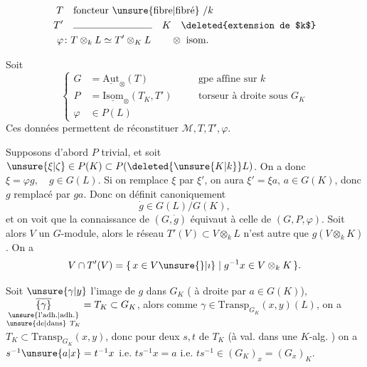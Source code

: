 \[
\begin{aligned}
T&\quad\text{foncteur \unsure{fibre|fibré} }/k\\
T'&\quad\rule{2.8cm}{.35pt}\quad K\quad\text{\deleted{extension de $k$}}\\
\varphi&\colon T\otimes_k L\simeq T'\otimes_K L\qquad\otimes\ \text{isom.}
\end{aligned}
\]

Soit
\[
\left\{\begin{aligned}
G&=\underline{\mathrm{Aut}}_{\otimes}(T)&\quad&\text{gpe affine sur }k\\
P&=\underline{\mathrm{Isom}}_{\otimes}(T_K,T')&&\text{torseur à droite sous }G_K\\
\varphi&\in P(L)
\end{aligned}\right.
\]
Ces données permettent de réconstituer $\mathcal M,T,T',\varphi$.

Supposons d'abord $P$ trivial, et soit $\unsure{\xi|\zeta}\in P(K)\subset P(\deleted{\unsure{K|k}}L)$. On a donc $\xi=\varphi g,\quad g\in G(L)$. Si on remplace $\xi$ par $\xi'$, on aura $\xi'=\xi a$, $a\in G(K)$, donc $g$ remplacé par $ga$. Donc on définit canoniquement
\[
\dot g\in G(L)/G(K),
\]
et on voit que la connaissance de $(G,\dot g)$ équivaut à celle de $(G,P,\varphi)$. Soit alors $V$ un $G$-module, alors le réseau $T'(V)\subset V\otimes_k L$ n'est autre que $g(V\otimes_k K)$. On a
\[
V\cap T'(V)=\{\,x\in V\unsure{\}|\imath}\mid g^{-1}x\in V\otimes_k K\,\}.
\]

  Soit $\unsure{\gamma|y}$ l'image de $g$ dans $G_K$ (  à droite par $a\in G(K)$), $\underset{\substack{\text{\unsure{l'adh.|adh.}}\\\text{\unsure{de|dans}}\ T_K}}{\overline{\{\gamma\}}}=T_K\subset G_K$,  alors  comme  $\gamma\in\mathrm{Transp}_{G_K}(x,y)(L)$, on a $T_K\subset\mathrm{Transp}_{G_K}(x,y)$,  donc pour deux   $s,t$  de $T_K$ (à val. dans une $K$-alg. ) on a $s^{-1}\unsure{a|x}=t^{-1}x$ i.e. $ts^{-1}x=a$ i.e. $ts^{-1}\in(G_K)_x=(G_x)_K$.


